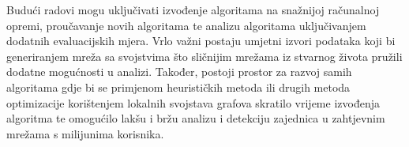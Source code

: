 Budući radovi mogu uključivati izvođenje algoritama na snažnijoj računalnoj opremi, proučavanje novih algoritama te analizu algoritama uključivanjem dodatnih evaluacijskih mjera. Vrlo važni postaju umjetni izvori podataka koji bi generiranjem mreža sa svojstvima što sličnijim mrežama iz stvarnog života pružili dodatne mogućnosti u analizi. Također, postoji prostor za razvoj samih algoritama gdje bi se primjenom heurističkih metoda ili drugih metoda optimizacije korištenjem lokalnih svojstava grafova skratilo vrijeme izvođenja algoritma te omogućilo lakšu i bržu analizu i detekciju zajednica u zahtjevnim mrežama s milijunima korisnika.
